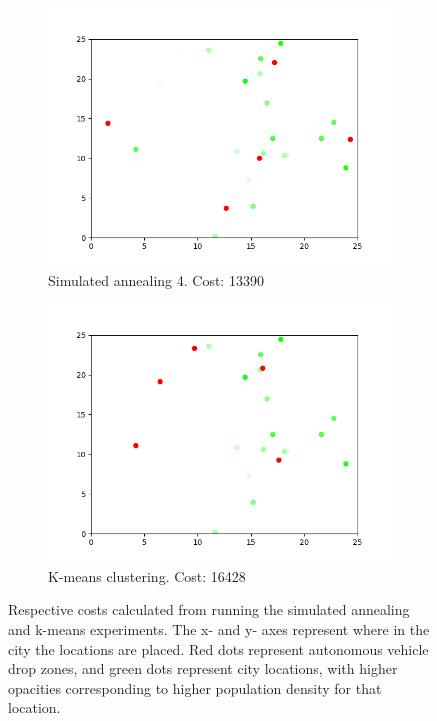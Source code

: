 \documentclass[11pt]{article}
\begin{document}
\begin{figure}[h!]
\begin{subfigure}[b]{0.4\linewidth}
    \includegraphics[width=\linewidth]{simulated_annealing_4.png}
    \caption*{Simulated annealing 4. Cost: 13390}
  \end{subfigure}
  \begin{subfigure}[b]{0.4\linewidth}
    \includegraphics[width=\linewidth]{k_means.png}
    \caption*{K-means clustering. Cost: 16428}
  \end{subfigure}
  \caption{Respective costs calculated from running the simulated annealing and k-means experiments. The x- and y- axes represent where in the city the locations are placed. Red dots represent autonomous vehicle drop zones, and green dots represent city locations, with higher opacities corresponding to higher population density for that location.}
\end{figure}
\end{document}
